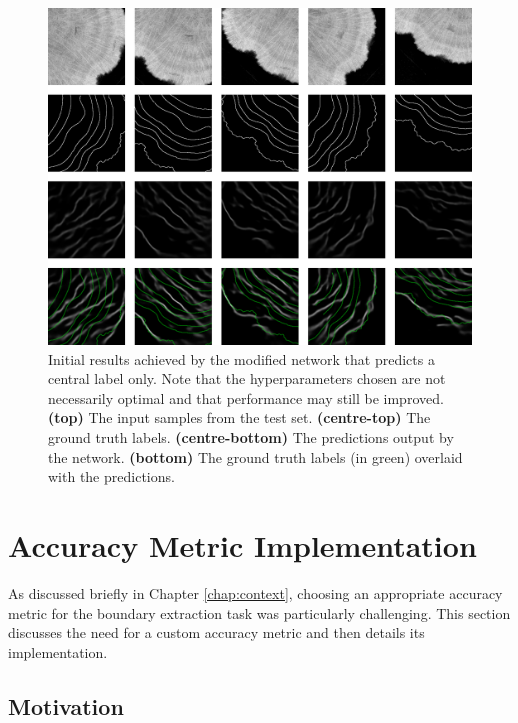\begin{figure}[t]
    \centering
    \includegraphics[width=1\textwidth]{images/initial-results-3D.png}
    \caption{Initial results achieved by the modified network that predicts a central label only. Note that the hyperparameters chosen are not necessarily optimal and that performance may still be improved. \textbf{(top)} The input samples from the test set. \textbf{(centre-top)} The ground truth labels. \textbf{(centre-bottom)} The predictions output by the network. \textbf{(bottom)} The ground truth labels (in green) overlaid with the predictions.}
    \label{fig:outputs2}
\end{figure}

\section{Accuracy Metric Implementation}
\label{sec:accimplementation}

As discussed briefly in Chapter \ref{chap:context}, choosing an appropriate accuracy metric for the boundary extraction task was particularly challenging. This section discusses the need for a custom accuracy metric and then details its implementation.

\subsection{Motivation}

